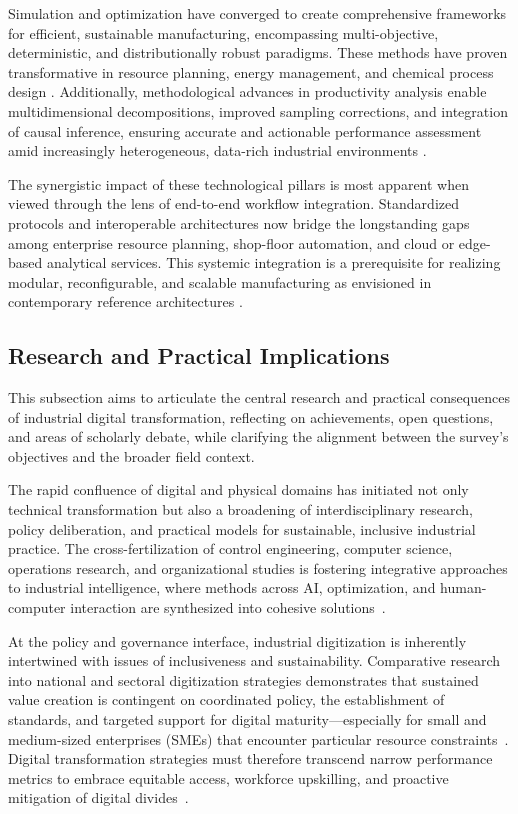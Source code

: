 \documentclass[sigconf]{acmart}
\begin{document}
Simulation and optimization have converged to create comprehensive frameworks for efficient, sustainable manufacturing, encompassing multi-objective, deterministic, and distributionally robust paradigms. These methods have proven transformative in resource planning, energy management, and chemical process design \cite{ref80}\cite{ref84}\cite{ref85}. Additionally, methodological advances in productivity analysis enable multidimensional decompositions, improved sampling corrections, and integration of causal inference, ensuring accurate and actionable performance assessment amid increasingly heterogeneous, data-rich industrial environments \cite{ref87}.

The synergistic impact of these technological pillars is most apparent when viewed through the lens of end-to-end workflow integration. Standardized protocols and interoperable architectures now bridge the longstanding gaps among enterprise resource planning, shop-floor automation, and cloud or edge-based analytical services. This systemic integration is a prerequisite for realizing modular, reconfigurable, and scalable manufacturing as envisioned in contemporary reference architectures \cite{ref3}\cite{ref29}.

\subsection{Research and Practical Implications}

This subsection aims to articulate the central research and practical consequences of industrial digital transformation, reflecting on achievements, open questions, and areas of scholarly debate, while clarifying the alignment between the survey's objectives and the broader field context.

The rapid confluence of digital and physical domains has initiated not only technical transformation but also a broadening of interdisciplinary research, policy deliberation, and practical models for sustainable, inclusive industrial practice. The cross-fertilization of control engineering, computer science, operations research, and organizational studies is fostering integrative approaches to industrial intelligence, where methods across AI, optimization, and human-computer interaction are synthesized into cohesive solutions~\cite{ref41}\cite{ref86}.

At the policy and governance interface, industrial digitization is inherently intertwined with issues of inclusiveness and sustainability. Comparative research into national and sectoral digitization strategies demonstrates that sustained value creation is contingent on coordinated policy, the establishment of standards, and targeted support for digital maturity—especially for small and medium-sized enterprises (SMEs) that encounter particular resource constraints~\cite{ref21}\cite{ref23}. Digital transformation strategies must therefore transcend narrow performance metrics to embrace equitable access, workforce upskilling, and proactive mitigation of digital divides~\cite{ref91}.
\end{document}
